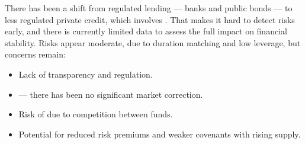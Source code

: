 
There has been a shift from regulated lending --- banks and public bonds --- to
less regulated private credit, which involves . That makes it hard to detect risks early, and there is
currently limited data to assess the full impact on financial stability. Risks
appear moderate, due to duration matching and low leverage, but concerns remain:

\begin{itemize}
\item Lack of transparency and regulation.
\item {} --- there has been no significant market
correction.
\item Risk of  due to competition between
funds.
\item Potential for reduced risk premiums and weaker covenants with rising supply.
\end{itemize}

